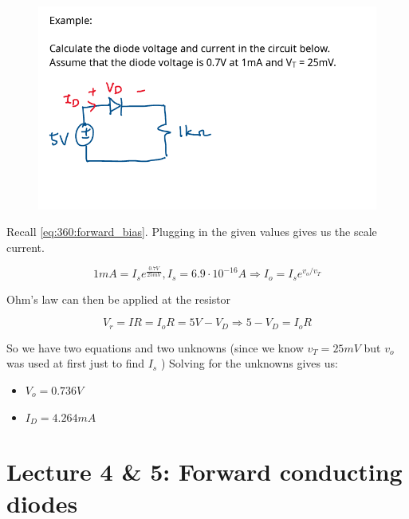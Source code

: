 \documentclass[../notes.tex]{subfiles}
\begin{document}
\begin{example}
	\begin{figure}[H]
		\centering
		\includegraphics[width=0.8\linewidth]{img/image_2022-09-13-13-55-18.png}
	\end{figure}

	Recall \eqref{eq:360:forward_bias}. Plugging in the given values gives us the scale current.

	\begin{equation}
		1mA = I_s e^{\frac{0.7V}{25mV}}, I_s = 6.9 \cdot 10^{-16} A \Rightarrow I_o = I_s e^{v_o/v_T}
	\end{equation}

	Ohm's law can then be applied at the resistor


	\begin{equation}
		V_r = IR = I_oR  = 5V - V_D \Rightarrow 5 - V_D = I_o R
	\end{equation}

	So we have two equations and two unknowns (since we know $ v_T = 25mV $ but $ v_o $ was used at first just to find $ I_s $ ) Solving for the unknowns gives us:

	\begin{itemize}
		\item $ V_o  = 0.736 V $
		\item $ I_D = 4.264 mA $ 
	\end{itemize}
\end{example}


\section{Lecture 4 \& 5: Forward conducting diodes}
\end{document}
